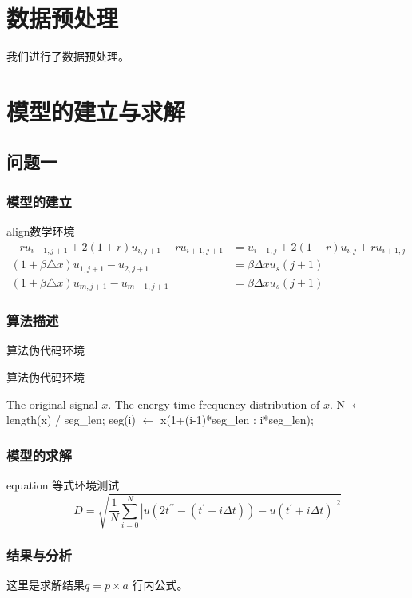 \documentclass{cumcmthesis}
\begin{document}
\section{数据预处理}
我们进行了数据预处理。
\section{模型的建立与求解}
\subsection{问题一}
\subsubsection{模型的建立}
align数学环境
\begin{align}
    -r u_{i-1, j+1}+2(1+r) u_{i, j+1}-r u_{i+1, j+1}{} & {}=u_{i-1, j}+2(1-r) u_{i, j}+r u_{i+1, j} \\
    (1+\beta \triangle x) u_{1, j+1}-u_{2, j+1}{}      & {}=\beta \Delta x u_{s}(j+1)               \\
    (1+\beta \triangle x) u_{m, j+1}-u_{m-1, j+1}{}    & {}=\beta \Delta x u_{s}(j+1)
\end{align}
\subsubsection{算法描述}
算法伪代码环境
\begin{algorithm}
    \caption{算法伪代码环境}
    \label{hhsa}
    \begin{algorithmic}[]  %
        \Require The original signal $x$.
        \Ensure  The energy-time-frequency distribution of $x$.
        \State  N $\gets$ length(x) / seg\_len;
        \State seg(i) $\gets$ x(1+(i-1)*seg\_len : i*seg\_len);
        \EndFor
        \EndFunction
    \end{algorithmic}
\end{algorithm}
\subsubsection{模型的求解}
equation 等式环境测试
\begin{equation}\label{D}
    D=\sqrt{\frac{1}{N}\sum_{i=0}^N{\left| u\left( 2t^{\prime\prime}-\left( t^\prime+i\Delta t \right) \right) -u\left( t^\prime+i\Delta t \right) \right|}^2}
\end{equation}
\subsubsection{结果与分析}
这里是求解结果$q=p\times a$ 行内公式。
\end{document}
